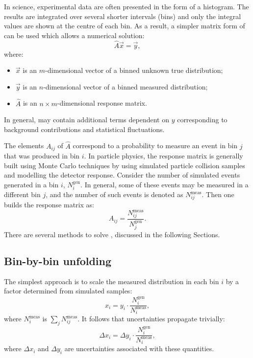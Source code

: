 In science, experimental data are often presented in the form of a histogram. 
The results are integrated over several shorter intervals (bins) and only the integral values are shown at the centre of each bin.
As a result, a simpler matrix form of  can be used which allows a numerical solution:
\begin{equation}\label{eq:unfolding_linear_equation}
\hat{A}\vec{x}=\vec{y},
\end{equation}
where:
\begin{itemize}
    \item $\vec{x}$ is an $m$-dimensional vector of a binned unknown true distribution;
    \item $\vec{y}$ is an $n$-dimensional vector of a binned measured distribution;
    \item $\hat{A}$ is an $n\times m$-dimensional response matrix.

\end{itemize}
In general,  may contain additional terms dependent on $y$ corresponding to background contributions and statistical fluctuations.

The elements $A_{ij}$ of $\hat{A}$ correspond to a probability to measure an event in bin $j$ that was produced in bin $i$.
In particle physics, the response matrix is generally built using Monte Carlo techniques by using simulated particle collision samples and modelling the detector response.
Consider the number of simulated events generated in a bin $i$, $N_i^{\mathrm{gen}}$. 
In general, some of these events may be measured in a different bin $j$, and the number of such events is denoted as $N_{ij}^{\mathrm{meas}}$.
Then one builds the response matrix as:
\begin{equation}\label{eq:response_matrix_element}
    A_{ij} = \frac{N_{ij}^{\mathrm{meas}}}{N_j^{\mathrm{gen}}}.
\end{equation}
There are several methods to solve , discussed in the following Sections.

\subsection{Bin-by-bin unfolding}

The simplest approach is to scale the measured distribution in each bin $i$ by a factor determined from simulated samples:
\begin{equation}\label{eq:bin_by_bin_unfolding}
 x_i = y_i \cdot \frac{N_i^{\mathrm{gen}}}{N_i^{\mathrm{meas}}},
\end{equation}
where $N_i^{\mathrm{meas}}$ is $\sum_j N_{ij}^{\mathrm{meas}}$.
It follows that uncertainties propagate trivially:
\begin{equation}\label{eq:bin_by_bin_unfolding_error}
    \Delta x_i = \Delta y_i \cdot \frac{N_i^{\mathrm{gen}}}{N_i^{\mathrm{meas}}},
\end{equation}
where $\Delta x_i$ and $\Delta y_i$ are uncertainties associated with these quantities.

